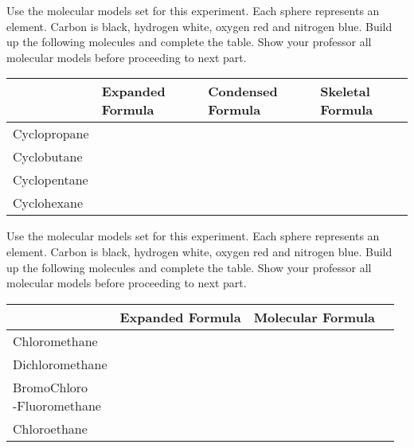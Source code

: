 \documentclass[main.tex]{subfiles}
\begin{document}
\newpage
\begin{fullwidth}
\vspace{0.2cm}{\large \bfseries Cyclic Alkanes}
Use the molecular models set for this experiment. Each sphere represents an element. Carbon is black, hydrogen white, oxygen red and nitrogen blue. Build up the following molecules and complete the table. Show your professor all molecular models before proceeding to next part.
\begin{center}\begin{tabular}{ |p{2cm}|p{5cm}| m{5cm}| m{5cm}| }
\hline
    & Expanded Formula &   Condensed Formula & Skeletal Formula   \\
\hline
\vspace{0cm}Cyclopropane\vspace{1.5cm} &       & &  \\
\hline
\vspace{0cm}Cyclobutane\vspace{1.5cm} &    &    & \\
\hline
\vspace{0cm}Cyclopentane\vspace{1.5cm} &  &      & \\
\hline
\vspace{0cm}Cyclohexane\vspace{1.5cm} &  &      & \\
\hline
\end{tabular}\end{center}



\vspace{0.2cm}{\large \bfseries Short alkanes with substituents}
Use the molecular models set for this experiment. Each sphere represents an element. Carbon is black, hydrogen white, oxygen red and nitrogen blue. Build up the following molecules and complete the table. Show your professor all molecular models before proceeding to next part.
\begin{center}\begin{tabular}{ |p{3cm}|p{5cm}| m{5cm}| m{5cm}| }
\hline
    & Expanded Formula &    Molecular Formula   \\
\hline
\vspace{0cm}Chloromethane\vspace{1.5cm} &        &  \\
\hline
\vspace{0cm}Dichloromethane\vspace{1.5cm} &       & \\
\hline
\vspace{0cm}
\makecell{BromoChloro\\-Fluoromethane}
\vspace{1.0cm} &        & \\
\hline
\vspace{0cm}Chloroethane\vspace{1.5cm} &        & \\
\hline
\end{tabular}\end{center}

\end{fullwidth}
\end{document}
